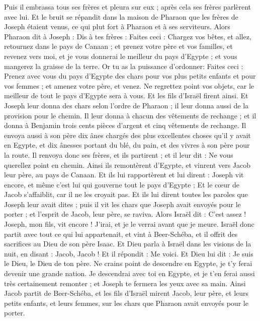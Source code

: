 \begin{multicols}{2}
Puis il embrassa tous ses frères et pleura sur eux ; après cela ses frères parlèrent avec lui.
Et le bruit se répandit dans la maison de Pharaon que les frères de Joseph étaient venus, ce qui plut fort à Pharaon et à ses serviteurs.
Alors Pharaon dit à Joseph : Dis à tes frères : Faites ceci : Chargez vos bêtes, et allez, retournez dans le pays de Canaan ;
et prenez votre père et vos familles, et revenez vers moi, et je vous donnerai le meilleur du pays d'Egypte ; et vous mangerez la graisse de la terre.
Or tu as la puissance d'ordonner: Faites ceci : Prenez avec vous du pays d'Egypte des chars pour vos plus petits enfants et pour vos femmes ; et amenez votre père, et venez.
Ne regrettez point vos objets, car le meilleur de tout le pays d'Egypte sera à vous.
Et les fils d'Israël firent ainsi. Et Joseph leur donna des chars selon l'ordre de Pharaon ; il leur donna aussi de la provision pour le chemin.
Il leur donna à chacun des vêtements de rechange ; et il donna à Benjamin trois cents pièces d'argent et cinq vêtements de rechange.
Il envoya aussi à son père dix ânes chargés des plus excellentes choses qu'il y avait en Egypte, et dix ânesses portant du blé, du pain, et des vivres à son père pour la route.
Il renvoya donc ses frères, et ils partirent ; et il leur dit : Ne vous querellez point en chemin.
Ainsi ils remontèrent d'Egypte, et vinrent vers Jacob leur père, au pays de Canaan.
Et ils lui rapportèrent et lui dirent : Joseph vit encore, et même c'est lui qui gouverne tout le pays d'Egypte ; Et le cœur de Jacob s'affaiblit, car il ne les croyait pas.
Et ils lui dirent toutes les paroles que Joseph leur avait dites ; puis il vit les chars que Joseph avait envoyés pour le porter ; et l'esprit de Jacob, leur père, se raviva.
Alors Israël dit : C'est assez ! Joseph, mon fils, vit encore ! J'irai, et je le verrai avant que je meure.
\VerseOne{}Israël donc partit avec tout ce qui lui appartenait, et vint à Beer-Schéba, et il offrit des sacrifices au Dieu de son père Isaac.
Et Dieu parla à Israël dans les visions de la nuit, en disant : Jacob, Jacob ! Et il répondit : Me voici.
Et Dieu lui dit : Je suis le Dieu, le Dieu de ton père. Ne crains point de descendre en Egypte, je t'y ferai devenir une grande nation.
Je descendrai avec toi en Egypte, et je t'en ferai aussi très certainement remonter ; et Joseph te fermera les yeux avec sa main.
Ainsi Jacob partit de Beer-Schéba, et les fils d'Israël mirent Jacob, leur père, et leurs petits enfants, et leurs femmes, sur les chars que Pharaon avait envoyés pour le porter.

\end{multicols}
